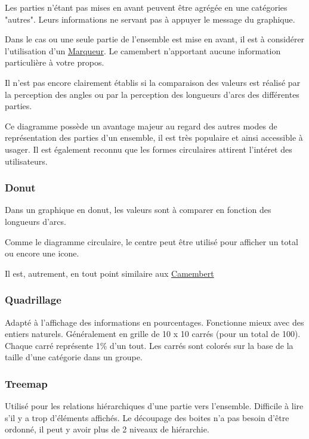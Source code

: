 \documentclass[a4paper,12pt]{article}
\begin{document}
\begin{multicols}{2}
Les parties n'étant pas mises en avant peuvent être agrégée en une catégories "autres". Leurs informations ne servant pas à appuyer le message du graphique. \autocite{jonathanschwabishParttowhole2021}

Dans le cas ou une seule partie de l'ensemble est mise en avant, il est à considérer l'utilisation d'un \hyperref[sec:org1b0dd98]{Marqueur}. Le camembert n'apportant aucune information particulière à votre propos.

Il n'est pas encore clairement établis si la comparaison des valeurs est réalisé par la perception des angles ou par la perception des longueurs d'arcs des différentes parties.\autocite{jonathanschwabishParttowhole2021}

Ce diagramme possède un avantage majeur au regard des autres modes de représentation des parties d'un ensemble, il est très populaire et ainsi accessible à usager. \autocite{jonathanschwabishParttowhole2021} Il est également reconnu que les formes circulaires attirent l'intéret des utilisateurs.\autocite{jonathanschwabishParttowhole2021}
\subsubsection*{Donut}
\label{sec:org7a752e7}
Dans un graphique en donut, les valeurs sont à comparer en fonction des longueurs d'arcs.

Comme le diagramme circulaire, le centre peut être utilisé pour afficher un total ou encore une icone. \autocite{alansmithLexiqueVisuel}

Il est, autrement, en tout point similaire aux \hyperref[sec:orgee9dc92]{Camembert}
\subsubsection*{Quadrillage}
\label{sec:org2668131}
Adapté à l'affichage des informations en pourcentages. Fonctionne mieux avec des entiers naturels. \autocite{alansmithLexiqueVisuel} Généralement en grille de 10 x 10 carrés (pour un total de 100). Chaque carré représente 1\% d'un tout. Les carrés sont colorés sur la base de la taille d'une catégorie dans un groupe. \autocite{mikeyiHowChooseRight2020}
\subsubsection*{Treemap}
\label{sec:org8dbc902}
Utilisé pour les relations hiérarchiques d'une partie vers l'ensemble. Difficile à lire s'il y a trop d'éléments affichés. \autocite{alansmithLexiqueVisuel}
Le découpage des boites n'a pas besoin d'être ordonné, il peut y avoir plus de 2 niveaux de hiérarchie. \autocite{mikeyiHowChooseRight2020}

\end{multicols}
\end{document}
